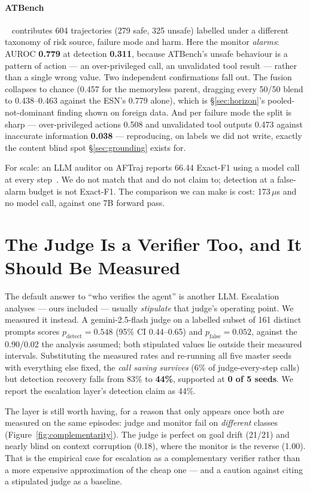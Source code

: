 \documentclass{article}
\begin{document}
\paragraph{ATBench}~\cite{atbench2026} contributes 604 trajectories (279 safe,
325 unsafe) labelled under a different taxonomy of risk source, failure mode and
harm. Here the monitor \emph{alarms}: AUROC \textbf{0.779} at detection
\textbf{0.311}, because ATBench's unsafe behaviour is a pattern of action --- an
over-privileged call, an unvalidated tool result --- rather than a single wrong
value. Two independent confirmations fall out. The fusion collapses to chance
(0.457 for the memoryless parent, dragging every 50/50 blend to 0.438--0.463
against the ESN's 0.779 alone), which is \S\ref{sec:horizon}'s
pooled-not-dominant finding shown on foreign data. And per failure mode the
split is sharp --- over-privileged actions 0.508 and unvalidated tool outputs
0.473 against inaccurate information \textbf{0.038} --- reproducing, on labels we
did not write, exactly the content blind spot \S\ref{sec:grounding} exists for.

For scale: an LLM auditor on AFTraj reports 66.44 Exact-F1 using a model call at
every step~\cite{zhang2026agentforesight}. We do not match that and do not claim
to; detection at a false-alarm budget is not Exact-F1. The comparison we can
make is cost: 173\,$\mu$s and no model call, against one 7B forward pass.

\section{The Judge Is a Verifier Too, and It Should Be Measured}
\label{sec:judge}

The default answer to ``who verifies the agent'' is another LLM. Escalation
analyses --- ours included --- usually \emph{stipulate} that judge's operating
point. We measured it instead. A gemini-2.5-flash judge on a labelled subset of
161 distinct prompts scores $p_{\text{detect}}=\mathbf{0.548}$ (95\% CI
0.44--0.65) and $p_{\text{false}}=\mathbf{0.052}$, against the 0.90/0.02 the
analysis assumed; both stipulated values lie outside their measured intervals.
Substituting the measured rates and re-running all five master seeds with
everything else fixed, the \emph{call saving survives} (6\% of judge-every-step
calls) but detection recovery falls from 83\% to \textbf{44\%}, supported at
\textbf{0 of 5 seeds}. We report the escalation layer's detection claim as 44\%.

The layer is still worth having, for a reason that only appears once both are
measured on the same episodes: judge and monitor fail on \emph{different}
classes (Figure~\ref{fig:complementarity}). The judge is perfect on goal drift
(21/21) and nearly blind on context corruption (0.18), where the monitor is the
reverse (1.00). That is the empirical case for escalation as a complementary
verifier rather than a more expensive approximation of the cheap one --- and a
caution against citing a stipulated judge as a baseline.
\end{document}
